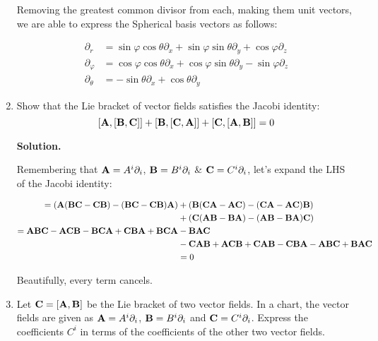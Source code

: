 \documentclass[10pt]{article}
\begin{document}
\begin{enumerate}[start=1,label={\bfseries Exercise \arabic*:},leftmargin=1in]
        Removing the greatest common divisor from each, making them unit vectors, we are able to express the Spherical basis vectors as follows:

        \begin{align*}
                   \partial_r &= \sin{\varphi} \cos{\theta} \partial_x + \sin{\varphi} \sin{\theta} \partial_y + \cos{\varphi} \partial_z \\
              \partial_{\varphi} &= \cos{\varphi} \cos{\theta} \partial_x + \cos{\varphi} \sin{\theta} \partial_y - \sin{\varphi} \partial_z \\
            \partial_{\theta} &= - \sin{\theta} \partial_x + \cos{\theta} \partial_y 
        \end{align*}






    \bigskip
    \item Show that the Lie bracket of vector fields satisfies the Jacobi identity: \[ [\vb{A}, [\vb{B}, \vb{C}]] + [\vb{B}, [\vb{C}, \vb{A}]] + [\vb{C}, [\vb{A}, \vb{B}]] = 0  \]

        \textbf{Solution.}

        Remembering that \(\vb{A} = A^i \partial_i\), \(\vb{B} = B^i \partial_i\) \& \(\vb{C} = C^i \partial_i\), let's expand the LHS of the Jacobi identity:

        \begin{align*}
            = ( \vb{A} (\vb{B}\vb{C}-\vb{C}\vb{B}) - (\vb{B}\vb{C}-\vb{C}\vb{B})\vb{A}) &+ ( \vb{B} (\vb{C}\vb{A}-\vb{A}\vb{C}) - (\vb{C}\vb{A}-\vb{A}\vb{C})\vb{B}) \\ 
            &+ ( \vb{C} (\vb{A}\vb{B}-\vb{B}\vb{A}) - (\vb{A}\vb{B}-\vb{B}\vb{A} )\vb{C} ) \\
            = \vb{ABC} - \vb{ACB} - \vb{BCA} + \vb{CBA} + \vb{BCA} &- \vb{BAC} \\ 
            &- \vb{CAB} + \vb{ACB} + \vb{CAB} - \vb{CBA} - \vb{ABC} + \vb{BAC} \\
            &= 0 
        \end{align*}

        Beautifully, every term cancels.


    \bigskip
    \item Let \(\vb{C} = [\vb{A}, \vb{B}]\) be the Lie bracket of two vector fields. In a chart, the vector fields are given as \(\vb{A} = A^i \partial_i\), \(\vb{B} = B^i \partial_i\) and \(\vb{C} = C^i \partial_i\). Express the coefficients \(C^i\) in terms of the coefficients of the other two vector fields.


\end{enumerate}
\end{document}
